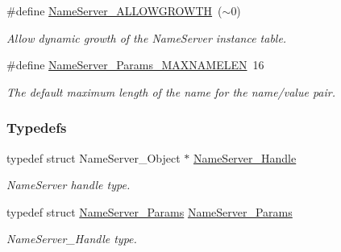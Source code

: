 \begin{DoxyCompactItemize}
\#define \hyperlink{_name_server_8h_aee02296103cd2e162143d40c917697d7}{NameServer\_\-ALLOWGROWTH}~($\sim$0)
\begin{DoxyCompactList}\small\item\em Allow dynamic growth of the NameServer instance table. \item\end{DoxyCompactList}\item 
\#define \hyperlink{_name_server_8h_afa52c74cc2d67bda4d5522418abb4585}{NameServer\_\-Params\_\-MAXNAMELEN}~16
\begin{DoxyCompactList}\small\item\em The default maximum length of the name for the name/value pair. \item\end{DoxyCompactList}\end{DoxyCompactItemize}
\subsubsection*{Typedefs}
\begin{DoxyCompactItemize}
\item 
typedef struct NameServer\_\-Object $\ast$ \hyperlink{_name_server_8h_a99fa93c4ee4169db90162b523d9152d4}{NameServer\_\-Handle}
\begin{DoxyCompactList}\small\item\em NameServer handle type. \item\end{DoxyCompactList}\item 
typedef struct \hyperlink{struct_name_server___params}{NameServer\_\-Params} \hyperlink{_name_server_8h_ad1c351b65dad7194f35c2ed9d7997b8d}{NameServer\_\-Params}
\begin{DoxyCompactList}\small\item\em NameServer\_\-Handle type. \item\end{DoxyCompactList}\end{DoxyCompactItemize}
